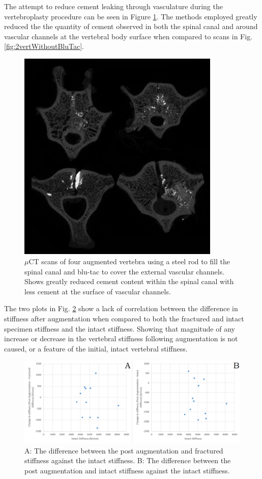The attempt to reduce cement leaking through vasculature during the vertebroplasty procedure can be seen in Figure \ref{fig:4vert_withBlutac}. The methods employed greatly reduced the the quantity of cement observed in both the spinal canal and around vascular channels at the vertebral body surface when compared to scans in Fig. \ref{fig:2vertWithoutBluTac}.

\begin{figure}[ht!]
\centering
\includegraphics[width=3.8in]{images/4vertPostBluTac.png}
\caption{$\mu$CT scans of four augmented vertebra using a steel rod to fill the spinal canal and blu-tac to cover the external vascular channels. Shows greatly reduced cement content within the spinal canal with less cement at the surface of vascular channels.}
\label{fig:4vert_withBlutac}
\end{figure}


The two plots in Fig. \ref{fig:deltaStiffness_Vs_intact} show a lack of correlation between the difference in stiffness after augmentation when compared to both the fractured and intact specimen stiffness and the intact stiffness. Showing that magnitude of any increase or decrease in the vertebral stiffness following augmentation is not caused, or a feature of the initial, intact vertebral stiffness.

\begin{figure}[ht!]
\centering
\includegraphics[width=\textwidth]{images/deltaStiffnessVsIntact.png}
\caption{A: The difference between the post augmentation and fractured stiffness against the intact stiffness. B: The difference between the post augmentation and intact stiffness against the intact stiffness.}
\label{fig:deltaStiffness_Vs_intact}
\end{figure}

